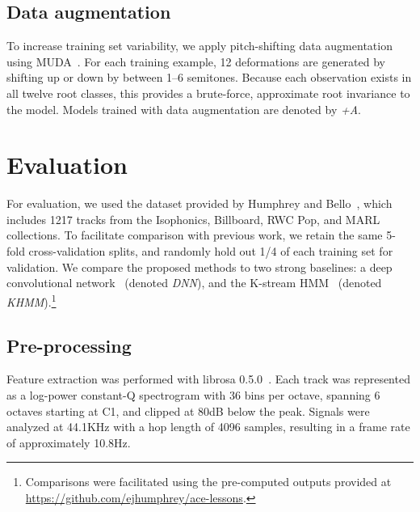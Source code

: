 \documentclass{article}
\begin{document}
\subsection{Data augmentation}
\label{sec:muda}
To increase training set variability, we apply pitch-shifting data augmentation using MUDA~\cite{mcfee2015software}.
For each training example, 12 deformations are generated by shifting up or down by between 1--6 semitones.
Because each observation exists in all twelve root classes, this provides a brute-force, approximate root invariance to the model.
Models trained with data augmentation are denoted by \emph{+A}.


\section{Evaluation}
For evaluation, we used the dataset provided by Humphrey and Bello~\cite{humphrey2015four}, which includes 1217 tracks from the Isophonics, Billboard, RWC Pop, and MARL collections.
To facilitate comparison with previous work, we retain the same 5-fold cross-validation splits, and randomly hold out 1/4 of each training set for validation.
We compare the proposed methods to two strong baselines: a deep convolutional network~\cite{humphrey2015four} (denoted \emph{DNN}), and the K-stream HMM~\cite{cho2014improved} (denoted \emph{KHMM}).\footnote{Comparisons were facilitated using the pre-computed outputs provided at \url{https://github.com/ejhumphrey/ace-lessons}.}

\subsection{Pre-processing}

Feature extraction was performed with librosa 0.5.0~\cite{librosa050}.
Each track was represented as a log-power constant-Q spectrogram with 36 bins per octave, spanning 6 octaves starting at C1, and clipped at 80dB below the peak.
Signals were analyzed at 44.1KHz with a hop length of 4096 samples, resulting in a frame rate of approximately 10.8Hz.
\end{document}
